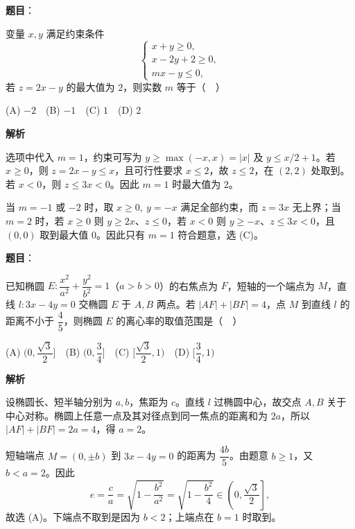 \begin{answer}

\textbf{题目}：

变量 \(x,y\) 满足约束条件
\nopagebreak[4]
\[
\begin{cases}
x+y\geqslant0,\\
x-2y+2\geqslant0,\\
mx-y\leqslant0,
\end{cases}
\]
若 \(z=2x-y\) 的最大值为 \(2\)，则实数 \(m\) 等于（　）

(A) \(-2\)　(B) \(-1\)　(C) \(1\)　(D) \(2\)

\textbf{解析}

选项中代入 \(m=1\)，约束可写为 \(y\geqslant\max(-x,x)=|x|\) 及 \(y\leqslant x/2+1\)。若 \(x\geqslant0\)，则 \(z=2x-y\leqslant x\)，且可行性要求 \(x\leqslant2\)，故 \(z\leqslant2\)，在 \((2,2)\) 处取到。若 \(x<0\)，则 \(z\leqslant3x<0\)。因此 \(m=1\) 时最大值为 \(2\)。

当 \(m=-1\) 或 \(-2\) 时，取 \(x\geqslant0,\ y=-x\) 满足全部约束，而 \(z=3x\) 无上界；当 \(m=2\) 时，若 \(x\geqslant0\) 则 \(y\geqslant2x\)、\(z\leqslant0\)，若 \(x<0\) 则 \(y\geqslant-x\)、\(z\leqslant3x<0\)，且 \((0,0)\) 取到最大值 \(0\)。因此只有 \(m=1\) 符合题意，选 (C)。


\end{answer}
\begin{answer}

\textbf{题目}：

已知椭圆 \(E:\dfrac{x^2}{a^2}+\dfrac{y^2}{b^2}=1\)（\(a>b>0\)）的右焦点为 \(F\)，短轴的一个端点为 \(M\)，直线 \(l:3x-4y=0\) 交椭圆 \(E\) 于 \(A,B\) 两点。若 \(|AF|+|BF|=4\)，点 \(M\) 到直线 \(l\) 的距离不小于 \(\dfrac45\)，则椭圆 \(E\) 的离心率的取值范围是（　）

(A) \((0,\dfrac{\sqrt3}{2}]\)　(B) \((0,\dfrac34]\)　(C) \([\dfrac{\sqrt3}{2},1)\)　(D) \([\dfrac34,1)\)

\textbf{解析}

设椭圆长、短半轴分别为 \(a,b\)，焦距为 \(c\)。直线 \(l\) 过椭圆中心，故交点 \(A,B\) 关于中心对称。椭圆上任意一点及其对径点到同一焦点的距离和为 \(2a\)，所以 \(|AF|+|BF|=2a=4\)，得 \(a=2\)。

短轴端点 \(M=(0,\pm b)\) 到 \(3x-4y=0\) 的距离为 \(\dfrac{4b}{5}\)。由题意 \(b\geqslant1\)，又 \(b<a=2\)。因此
\nopagebreak[4]
\[
e=\frac ca=\sqrt{1-\frac{b^2}{a^2}}=\sqrt{1-\frac{b^2}{4}}\in\left(0,\frac{\sqrt3}{2}\right],
\]
故选 (A)。下端点不取到是因为 \(b<2\)；上端点在 \(b=1\) 时取到。


\end{answer}
